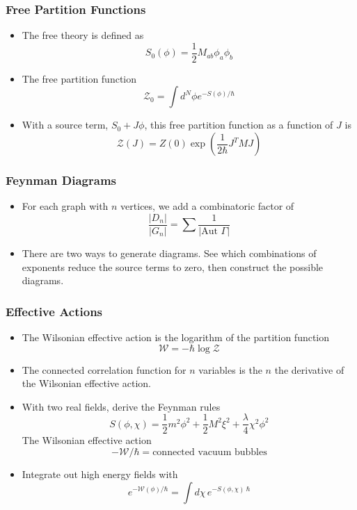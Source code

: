 \documentclass[11pt, oneside]{article}   	%
\theoremstyle{slanted}
\begin{document}
\subsubsection{Free Partition Functions}
\begin{itemize}
	\item The free theory is defined as 
		\[
		 S_0\left( \phi  \right)   = \frac{1}{2 } M _{ ab } \phi _ a \phi _b 
		\] 
	\item The free partition function 
		\[
			\mathcal{ Z } _ 0  = \int d ^N \phi e^{  - S \left( \phi  \right)  
			 / \hbar } 
		\] 
	\item With a source term, $ S_ 0 + J \phi $, this free partition 
		function as a function of $ J $ is 
		\[
			\mathcal{ Z } \left(  J  \right)   = 
			Z\left( 0  \right)  \exp ( \frac{1}{2\hbar  } J ^ T 
			M J ) 
		\] 
\end{itemize}


\subsubsection{Feynman Diagrams}
\begin{itemize}
	\item For each graph with $ n $ vertices, we add a combinatoric factor of 
		\[
		 \frac{| D _ n |  }{ | G _ n  | }  = \sum \frac{1}{ | \text{Aut } \Gamma | }
		\]
	\item There are two ways to generate diagrams. 
		See which combinations of exponents 
		reduce the source terms to zero, 
		then construct the possible diagrams. 
\end{itemize}

\subsubsection{Effective Actions}
\begin{itemize}
	\item The Wilsonian effective action 
		is the logarithm of the partition 
		function 
		\[
		 \mathcal{ W } =  - \hbar \log \mathcal{ Z } 
		\]
	\item The connected correlation function for $ n $ 
		variables is the $ n $ the derivative 
		of the Wilsonian effective action. 
	\item With two real 
		fields, derive the Feynman rules 
		\[
			S\left( \phi , \chi  \right)   = \frac{1}{2 } m ^2  \phi ^ 2 
			+ \frac{1}{2 } M ^ 2 \xi ^ 2  + \frac{\lambda}{4 } 
			\chi ^ 2 \phi ^ 2 
		\] The Wilsonian effective action 
		\[
		  - \mathcal{ W }  / \hbar = \text{connected vacuum bubbles} 
		\] 
	\item Integrate out high energy fields with 
		\[
			e ^{  - \mathcal{ W } \left( \phi  \right)   / \hbar } 
			= \int d \chi \, e ^{  - S \left( \phi , \chi  \right)   \ \hbar } 
		\] 
\end{itemize}
\end{document}
